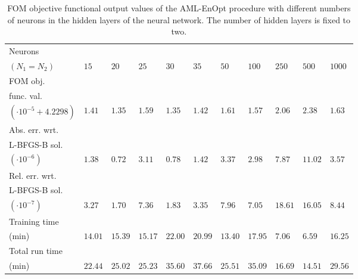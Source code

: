 \begin{table}[h]
\caption{\label{DNNStructFOMComparison} FOM objective functional output values of the AML-EnOpt procedure with different numbers of neurons in the hidden layers of the neural network. The number of hidden layers is fixed to two.}
\centering
\begin{tabular}{|l|llllllllll|}
\hline
Neurons&&&&&&&&&&\\
$(N_1=N_2)$& $15$ & $20$ & $25$ & $30$ & $35$ & $50$ & $100$ & $250$ & $500$ & $1000$\\
\hline
FOM obj.&&&&&&&&&&\\
func. val.&&&&&&&&&&\\
$(\cdot 10^{-5}+4.2298)$& $1.41$ & $1.35$ & $1.59$ & $1.35$ & $1.42$ & $1.61$ & $1.57$ & $2.06$ & $2.38$ & $1.63$\\
\hline
Abs. err. wrt.&&&&&&&&&&\\
L-BFGS-B sol.&&&&&&&&&&\\
$(\cdot 10^{-6})$& $1.38$ & $0.72$ & $3.11$ & $0.78$ & $1.42$ & $3.37$ & $2.98$ & $7.87$ & $11.02$ & $3.57$\\
\hline
Rel. err. wrt.&&&&&&&&&&\\
L-BFGS-B sol.&&&&&&&&&&\\
$(\cdot 10^{-7})$& $3.27$ & $1.70$ & $7.36$ & $1.83$ & $3.35$ & $7.96$ & $7.05$ & $18.61$ & $16.05$ & $8.44$\\
\hline
Training time&&&&&&&&&&\\
(min)& $14.01$ & $15.39$ & $15.17$ & $22.00$ & $20.99$ & $13.40$ & $17.95$ & $7.06$ & $6.59$ & $16.25$\\
\hline
Total run time&&&&&&&&&&\\
(min)& $22.44$ & $25.02$ & $25.23$ & $35.60$ & $37.66$ & $25.51$ & $35.09$ & $16.69$ & $14.51$ & $29.56$\\
\hline
\end{tabular}
\end{table}

